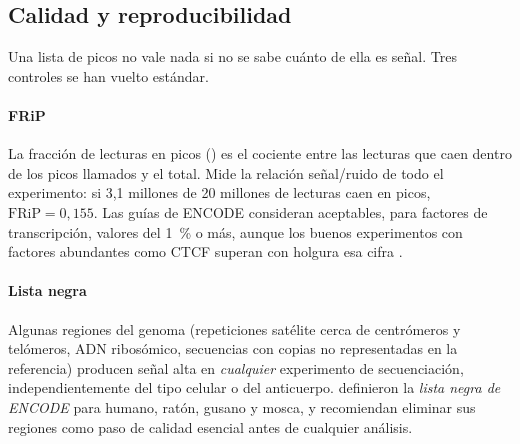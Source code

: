 \subsection{Calidad y reproducibilidad}

Una lista de picos no vale nada si no se sabe cuánto de ella es señal. Tres controles se han vuelto estándar.

\paragraph{FRiP} La fracción de lecturas en picos () es el cociente entre las lecturas que caen dentro de los picos llamados y el total. Mide la relación señal/ruido de todo el experimento: si 3,1 millones de 20 millones de lecturas caen en picos, $\mathrm{FRiP}=0{,}155$. Las guías de ENCODE consideran aceptables, para factores de transcripción, valores del \SI{1}{\percent} o más, aunque los buenos experimentos con factores abundantes como CTCF superan con holgura esa cifra \parencite{c13-landt2012}.

\paragraph{Lista negra} Algunas regiones del genoma (repeticiones satélite cerca de centrómeros y telómeros, ADN ribosómico, secuencias con copias no representadas en la referencia) producen señal alta en \emph{cualquier} experimento de secuenciación, independientemente del tipo celular o del anticuerpo. \textcite{c13-amemiya2019} definieron la \emph{lista negra de ENCODE} para humano, ratón, gusano y mosca, y recomiendan eliminar sus regiones como paso de calidad esencial antes de cualquier análisis.

